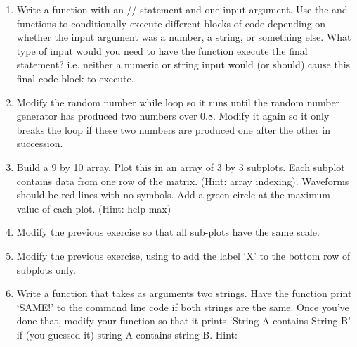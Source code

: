 \documentclass{article}
\begin{document}
\begin{enumerate}
\item Write a function with an // statement and one input argument. Use the  and  functions to conditionally execute different blocks of code depending on whether the input argument was a number, a string, or something else. What type of input would you need to have the function execute the final  statement? i.e. neither a numeric or string input would (or should) cause this final code block to execute. 

\item Modify the random number while loop so it runs until the random number generator has produced two numbers over 0.8. Modify it again so it only breaks the loop if these two numbers are produced one after the other in succession. 

\item Build a 9 by 10 array. Plot this in an array of 3 by 3 subplots. Each subplot contains data from one row of the matrix. (Hint: array indexing). Waveforms should be red lines with no symbols. Add a green circle at the maximum value of each plot. (Hint: help max)

\item Modify the previous exercise so that all sub-plots have the same scale. 

\item Modify the previous exercise, using  to add the label `X' to the bottom row of subplots only. 

\item Write a function that takes as arguments two strings. Have the function print `SAME!' to the command line code if both strings are the same. Once you've done that,  modify your function so that it prints `String A contains String B' if (you guessed it) string A contains string B. Hint: 

\end{enumerate}
\end{document}
